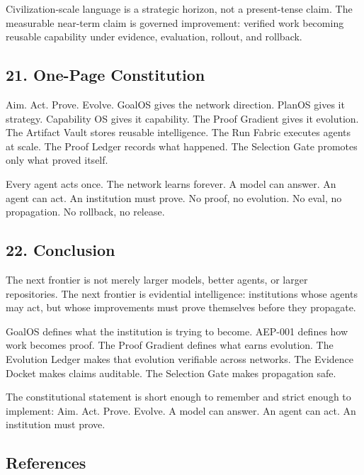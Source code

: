 \documentclass[
]{article}
\begin{document}
Civilization-scale language is a strategic horizon, not a present-tense
claim. The measurable near-term claim is governed improvement: verified
work becoming reusable capability under evidence, evaluation, rollout,
and rollback.

\subsection{21. One-Page Constitution}\label{one-page-constitution}

Aim. Act. Prove. Evolve. GoalOS gives the network direction. PlanOS
gives it strategy. Capability OS gives it capability. The Proof Gradient
gives it evolution. The Artifact Vault stores reusable intelligence. The
Run Fabric executes agents at scale. The Proof Ledger records what
happened. The Selection Gate promotes only what proved itself.

Every agent acts once. The network learns forever. A model can answer.
An agent can act. An institution must prove. No proof, no evolution. No
eval, no propagation. No rollback, no release.

\subsection{22. Conclusion}\label{conclusion}

The next frontier is not merely larger models, better agents, or larger
repositories. The next frontier is evidential intelligence: institutions
whose agents may act, but whose improvements must prove themselves
before they propagate.

GoalOS defines what the institution is trying to become. AEP-001 defines
how work becomes proof. The Proof Gradient defines what earns evolution.
The Evolution Ledger makes that evolution verifiable across networks.
The Evidence Docket makes claims auditable. The Selection Gate makes
propagation safe.

The constitutional statement is short enough to remember and strict
enough to implement: Aim. Act. Prove. Evolve. A model can answer. An
agent can act. An institution must prove.

\subsection{References}\label{references}
\end{document}

